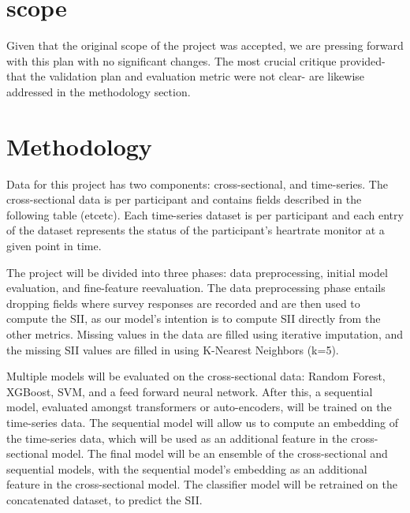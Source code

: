 \documentclass[11pt]{extarticle}
\newcommand{\todo}{\textcolor{red}{TODO:}~}
\begin{document}
\section{scope}

    Given that the original scope of the project was accepted, we are pressing forward with this plan with no significant changes.
    The most crucial critique provided- that the validation plan and evaluation metric were not clear- are likewise addressed in the methodology section.

\section{Methodology} 

Data for this project has two components: cross-sectional, and time-series. The cross-sectional data is per participant and contains fields described in the following table (etcetc).
Each time-series dataset is per participant and each entry of the dataset represents the status of the participant's heartrate monitor at a given point in time.

The project will be divided into three phases: data preprocessing, initial model evaluation, and fine-feature reevaluation.
The data preprocessing phase entails dropping fields where survey responses are recorded and are then used to compute the SII, as our model's intention is to compute SII directly from the other metrics.
Missing values in the data are filled using iterative imputation, and the missing SII values are filled in using K-Nearest Neighbors (k=5).

Multiple models will be evaluated on the cross-sectional data: Random Forest, XGBoost, SVM, and a feed forward neural network. After this, a sequential model, evaluated amongst transformers or auto-encoders, will be trained on the time-series data. The sequential model will allow us to compute an embedding of the time-series data, which will be used as an additional feature in the cross-sectional model.
The final model will be an ensemble of the cross-sectional and sequential models, with the sequential model's embedding as an additional feature in the cross-sectional model. The classifier model will be retrained on the concatenated dataset, to predict the SII.
\end{document}
